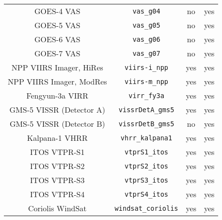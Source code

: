 \begin{center}
\begin{longtable}{c c c c}
  GOES-4 VAS                         & \texttt{vas\_g04}            &  no      &  yes       \\
  GOES-5 VAS                         & \texttt{vas\_g05}            &  no      &  yes       \\
  GOES-6 VAS                         & \texttt{vas\_g06}            &  no      &  yes       \\
  GOES-7 VAS                         & \texttt{vas\_g07}            &  no      &  yes       \\
  NPP VIIRS Imager, HiRes            & \texttt{viirs-i\_npp}        &  yes     &  yes       \\
  NPP VIIRS Imager, ModRes           & \texttt{viirs-m\_npp}        &  yes     &  yes       \\
  Fengyun-3a VIRR                    & \texttt{virr\_fy3a}          &  yes     &  yes       \\
  GMS-5 VISSR (Detector A)           & \texttt{vissrDetA\_gms5}     &  yes     &  yes       \\
  GMS-5 VISSR (Detector B)           & \texttt{vissrDetB\_gms5}     &  no      &  yes       \\
  Kalpana-1 VHRR                     & \texttt{vhrr\_kalpana1}      &  yes     &  yes       \\
  ITOS VTPR-S1                       & \texttt{vtprS1\_itos}        &  yes     &  yes       \\
  ITOS VTPR-S2                       & \texttt{vtprS2\_itos}        &  yes     &  yes       \\
  ITOS VTPR-S3                       & \texttt{vtprS3\_itos}        &  yes     &  yes       \\
  ITOS VTPR-S4                       & \texttt{vtprS4\_itos}        &  yes     &  yes       \\
  Coriolis WindSat                   & \texttt{windsat\_coriolis}   &  yes     &  yes       \\

\end{longtable}
\end{center}
